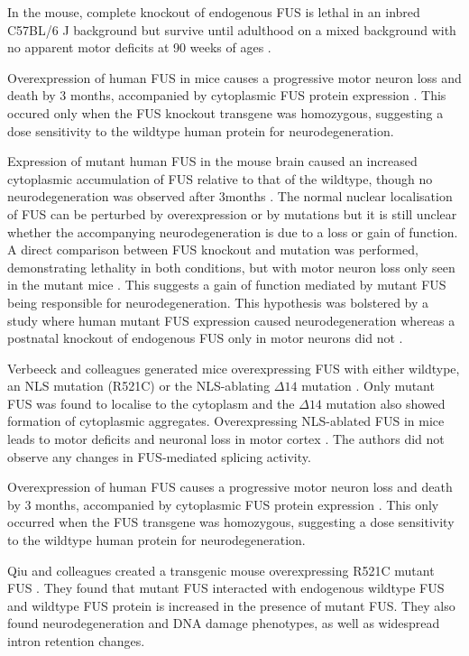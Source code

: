 In the mouse, complete knockout of endogenous FUS is lethal in an inbred C57BL/6 J background  \citep{Hicks2000, Kuroda2000} but survive until adulthood on a mixed background with no apparent motor deficits at 90 weeks of ages \citep{Kino2015}.

Overexpression of human FUS in mice causes a progressive motor neuron loss and death by 3 months, accompanied by cytoplasmic FUS protein expression \citep{Mitchell2013}. 
This occured only when the FUS knockout transgene was homozygous, suggesting a dose sensitivity to the wildtype human protein for neurodegeneration. 

Expression of mutant human FUS in the mouse brain caused an increased cytoplasmic accumulation of FUS relative to that of the wildtype, though no neurodegeneration was observed after 3months \citep{Verbeeck2012}. 
The normal nuclear localisation of FUS can be perturbed by overexpression or by mutations but it is still unclear whether the accompanying neurodegeneration is due to a loss or gain of function. 
A direct comparison between FUS knockout and mutation was performed, demonstrating lethality in both conditions, but with motor neuron loss only seen in the mutant mice \citep{Scekic-zahirovic2016}. 
This suggests a gain of function mediated by mutant FUS being responsible for neurodegeneration. 
This hypothesis was bolstered by a study where human mutant FUS expression caused neurodegeneration whereas a postnatal knockout of endogenous FUS only in motor neurons did not \citep{Sharma2016}. 

Verbeeck and colleagues generated mice overexpressing FUS with either wildtype, an NLS mutation (R521C) or the NLS-ablating $\Delta14$ mutation \cite{Verbeeck2012}. Only mutant FUS was found to localise to the cytoplasm and the $\Delta14$ mutation also showed formation of cytoplasmic aggregates. 
Overexpressing NLS-ablated FUS in mice leads to motor deficits and neuronal loss in motor cortex \citep{Shiihashi2016}. The authors did not observe any changes in FUS-mediated splicing activity.

Overexpression of human FUS causes a progressive motor neuron loss and death by 3 months, accompanied by cytoplasmic FUS protein expression \citep{Mitchell2013}. 
This only occurred when the FUS transgene was homozygous, suggesting a dose sensitivity to the wildtype human protein for neurodegeneration. 

Qiu and colleagues created a transgenic mouse overexpressing R521C mutant FUS \citeyear{Qiu2014}. 
They found that mutant FUS interacted with endogenous wildtype FUS and wildtype FUS protein is increased in the presence of mutant FUS. They also found neurodegeneration and DNA damage phenotypes, as well as widespread intron retention changes. 
















